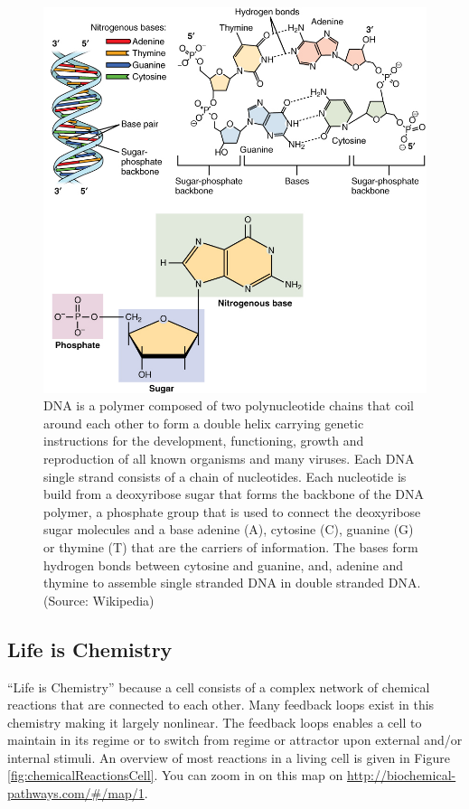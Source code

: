 \documentclass[
  11pt,
]{book}
\begin{document}
\begin{figure}

{\centering \includegraphics[width=0.5\linewidth]{./figs/DNA_Nucleotides} 

}

\caption{DNA is a polymer composed of two polynucleotide chains that coil around each other to form a double helix carrying genetic instructions for the development, functioning, growth and reproduction of all known organisms and many viruses. Each DNA single strand consists of a chain of nucleotides. Each nucleotide is build from a deoxyribose sugar that forms the backbone of the DNA  polymer, a phosphate group that is used to connect the deoxyribose sugar molecules and a base adenine (A), cytosine (C), guanine (G) or thymine (T) that are the carriers of information. The bases form hydrogen bonds between cytosine and guanine, and, adenine and thymine to assemble single stranded DNA in double stranded DNA. (Source: Wikipedia)}\label{fig:DNA}
\end{figure}

\newpage

\hypertarget{lifeChemistry}{%
\subsection{Life is Chemistry}\label{lifeChemistry}}

``Life is Chemistry'' because a cell consists of a complex network of chemical reactions that are connected to each other. Many feedback loops exist in this chemistry making it largely nonlinear. The feedback loops enables a cell to maintain in its regime or to switch from regime or attractor upon external and/or internal stimuli. An overview of most reactions in a living cell is given in Figure \ref{fig:chemicalReactionsCell}. You can zoom in on this map on \url{http://biochemical-pathways.com/\#/map/1}.
\end{document}
